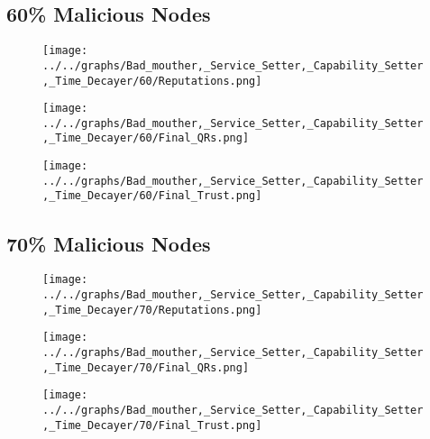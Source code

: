 \begin{minipage}[t]{0.49\columnwidth}
\subsection*{60\% Malicious Nodes}
    \begin{figure}[H]
        \centering
        \texttt{[image: ../../graphs/Bad\_mouther,\_Service\_Setter,\_Capability\_Setter,\_Time\_Decayer/60/Reputations.png]}
    \end{figure}
    \begin{figure}[H]
        \centering
        \texttt{[image: ../../graphs/Bad\_mouther,\_Service\_Setter,\_Capability\_Setter,\_Time\_Decayer/60/Final\_QRs.png]}
    \end{figure}
\end{minipage}
\begin{minipage}[t]{0.49\columnwidth}
    \begin{figure}[H]
        \centering
        \texttt{[image: ../../graphs/Bad\_mouther,\_Service\_Setter,\_Capability\_Setter,\_Time\_Decayer/60/Final\_Trust.png]}
    \end{figure}
\end{minipage}

\begin{minipage}[t]{0.49\columnwidth}
\subsection*{70\% Malicious Nodes}
    \begin{figure}[H]
        \centering
        \texttt{[image: ../../graphs/Bad\_mouther,\_Service\_Setter,\_Capability\_Setter,\_Time\_Decayer/70/Reputations.png]}
    \end{figure}
    \begin{figure}[H]
        \centering
        \texttt{[image: ../../graphs/Bad\_mouther,\_Service\_Setter,\_Capability\_Setter,\_Time\_Decayer/70/Final\_QRs.png]}
    \end{figure}
\end{minipage}
\begin{minipage}[t]{0.49\columnwidth}
    \begin{figure}[H]
        \centering
        \texttt{[image: ../../graphs/Bad\_mouther,\_Service\_Setter,\_Capability\_Setter,\_Time\_Decayer/70/Final\_Trust.png]}
    \end{figure}
\end{minipage}

